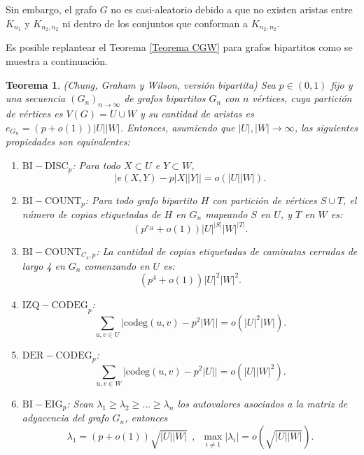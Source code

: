 \documentclass{article}[14pts]
\newtheorem{teorema}{Teorema}
\newcommand{\bidisc}{\mathrm{BI-DISC}}
\newcommand{\bicount}{\mathrm{BI-COUNT}}
\newcommand{\izcodeg}{\mathrm{IZQ-CODEG}}
\newcommand{\dercodeg}{\mathrm{DER-CODEG}}
\newcommand{\bieig}{\mathrm{BI-EIG}}
\newcommand{\cod}{\mathrm{codeg}}
\begin{document}
Sin embargo, el grafo $G$ no es casi-aleatorio debido a que no existen aristas entre $K_{n_1}$ y $K_{n_2, n_2}$ ni dentro de los conjuntos que conforman a $K_{n_2, n_2}$.\medskip

Es posible replantear el Teorema \ref{Teorema CGW} para grafos bipartitos como se muestra a continuación.

\begin{teorema} \label{Teorema CGW Bipartito} (Chung, Graham y Wilson, versión bipartita)
    Sea $p\in (0,1)$ fijo y una secuencia $(G_n)_{n\to\infty}$ de grafos bipartitos $G_n$ con $n$ vértices, cuya partición de vértices es $V(G) = U\cup W$ y su cantidad de aristas es $e_{G_n} = (p + o(1))|U||W|$. Entonces, asumiendo que $|U|,|W|\to\infty$, las siguientes propiedades son equivalentes:\medskip

    \begin{enumerate}
        \item[\makebox[0.5cm]{$\bidisc_p$:} Para todo $X\subset U$ e $Y\subset W$,
        \[
            \Big| e(X,Y) - p|X||Y|\Big| = o(|U||W|).
        \]

        \item[\makebox[0.5cm]{$\bicount_p$:} Para todo grafo bipartito $H$ con partición de vértices $S\cup T$, el número de copias etiquetadas de $H$ en $G_n$ mapeando $S$ en $U$, y $T$ en $W$ es:
        \[
            \left( p^{e_H} + o(1)\right)|U|^{|S|}|W|^{|T|}.
        \]

        \item[\makebox[0.5cm]{$\bicount_{C_4, p}$:} La cantidad de copias etiquetadas de caminatas cerradas de largo 4 en $G_n$ comenzando en $U$ es:
        \[
            \left( p^{4} + o(1)\right)|U|^{2} |W|^{2}.
        \]

        \item[\makebox[0.5cm]{$\izcodeg_p$:} 
        \[
            \sum_{u,v\in U} \Big| \cod(u,v) - p^{2}|W|\Big| = o(|U|^{2}|W|).
        \]

        \item[\makebox[0.5cm]{$\dercodeg_p$:}
        \[
            \sum_{u,v\in W} \Big| \cod(u,v) - p^{2}|U|\Big| = o(|U||W|^{2}).
        \]

        \item[\makebox[0.5cm]{$\bieig_p$:} Sean $\lambda_1 \geq \lambda_2 \geq ...\geq \lambda_n$ los autovalores asociados a la matriz de adyacencia del grafo $G_n$, entonces
        \[
            \lambda_1 = (p + o(1))\sqrt{|U||W|}\ \ \text{,}\ \ \ \displaystyle\max_{i\not= 1}|\lambda _{i}| = o(\sqrt{|U||W|}).
        \]
    \end{enumerate}
\end{teorema}\medskip
\end{document}
